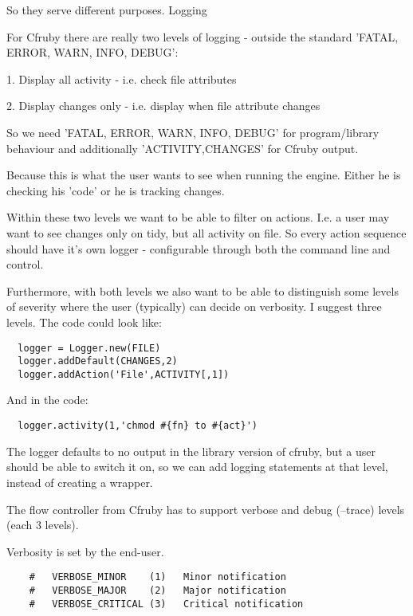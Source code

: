 So they serve different purposes.
Logging

For Cfruby there are really two levels of logging - outside the
standard 'FATAL, ERROR, WARN, INFO, DEBUG':

1. Display all activity - i.e. check file attributes

2. Display changes only - i.e. display when file attribute changes

So we need 'FATAL, ERROR, WARN, INFO, DEBUG' for program/library
behaviour and additionally 'ACTIVITY,CHANGES' for Cfruby output.

Because this is what the user wants to see when running the engine.
Either he is checking his 'code' or he is tracking changes.

Within these two levels we want to be able to filter on actions. I.e.
a user may want to see changes only on tidy, but all activity on file.
So every action sequence should have it's own logger -
configurable through both the command line and control.

Furthermore, with both levels we also want to be able to distinguish
some levels of severity where the user (typically) can decide on
verbosity. I suggest three levels. The code could look like:

\begin{verbatim}
  logger = Logger.new(FILE)
  logger.addDefault(CHANGES,2)
  logger.addAction('File',ACTIVITY[,1])
\end{verbatim}


And in the code:

\begin{verbatim}
  logger.activity(1,'chmod #{fn} to #{act}')
\end{verbatim}

The logger defaults to no output in the library version of cfruby, but
a user should be able to switch it on, so we can add logging
statements at that level, instead of creating a wrapper.



The flow controller from Cfruby has to support verbose and debug              
(--trace) levels (each 3 levels).                                             
                                                                              
Verbosity is set by the end-user.                                             
                                                                   
\begin{verbatim}
    #   VERBOSE_MINOR    (1)   Minor notification                             
    #   VERBOSE_MAJOR    (2)   Major notification                             
    #   VERBOSE_CRITICAL (3)   Critical notification                          
\end{verbatim}
                                                                              
